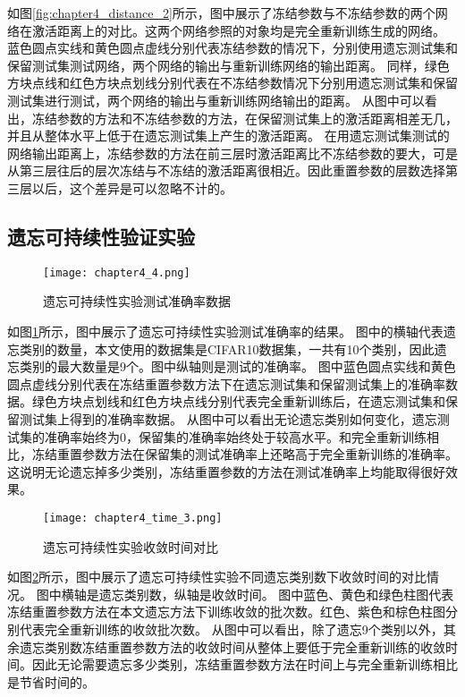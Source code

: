 如图\ref{fig:chapter4_distance_2}所示，图中展示了冻结参数与不冻结参数的两个网络在激活距离上的对比。这两个网络参照的对象均是完全重新训练生成的网络。
蓝色圆点实线和黄色圆点虚线分别代表冻结参数的情况下，分别使用遗忘测试集和保留测试集测试网络，两个网络的输出与重新训练网络的输出距离。
同样，绿色方块点线和红色方块点划线分别代表在不冻结参数情况下分别用遗忘测试集和保留测试集进行测试，两个网络的输出与重新训练网络输出的距离。
从图中可以看出，冻结参数的方法和不冻结参数的方法，在保留测试集上的激活距离相差无几，并且从整体水平上低于在遗忘测试集上产生的激活距离。
在用遗忘测试集测试的网络输出距离上，冻结参数的方法在前三层时激活距离比不冻结参数的要大，可是从第三层往后的层次冻结与不冻结的激活距离很相近。因此重置参数的层数选择第三层以后，这个差异是可以忽略不计的。


\subsection{遗忘可持续性验证实验}
\begin{figure}
    \centering
    \texttt{[image: chapter4\_4.png]}
    \caption{遗忘可持续性实验测试准确率数据}
    \label{fig:chapter4_4}
\end{figure}

如图\ref{fig:chapter4_4}所示，图中展示了遗忘可持续性实验测试准确率的结果。
图中的横轴代表遗忘类别的数量，本文使用的数据集是CIFAR10数据集，一共有10个类别，因此遗忘类别的最大数量是9个。图中纵轴则是测试的准确率。
图中蓝色圆点实线和黄色圆点虚线分别代表在冻结重置参数方法下在遗忘测试集和保留测试集上的准确率数据。绿色方块点划线和红色方块点线分别代表完全重新训练后，在遗忘测试集和保留测试集上得到的准确率数据。
从图中可以看出无论遗忘类别如何变化，遗忘测试集的准确率始终为0，保留集的准确率始终处于较高水平。和完全重新训练相比，冻结重置参数方法在保留集的测试准确率上还略高于完全重新训练的准确率。
这说明无论遗忘掉多少类别，冻结重置参数的方法在测试准确率上均能取得很好效果。

\begin{figure}
    \centering
    \texttt{[image: chapter4\_time\_3.png]}
    \caption{遗忘可持续性实验收敛时间对比}
    \label{fig:chapter4_time_3}
\end{figure}

如图\ref{fig:chapter4_time_3}所示，图中展示了遗忘可持续性实验不同遗忘类别数下收敛时间的对比情况。
图中横轴是遗忘类别数，纵轴是收敛时间。
图中蓝色、黄色和绿色柱图代表冻结重置参数方法在本文遗忘方法下训练收敛的批次数。红色、紫色和棕色柱图分别代表完全重新训练的收敛批次数。
从图中可以看出，除了遗忘9个类别以外，其余遗忘类别数冻结重置参数方法的收敛时间从整体上要低于完全重新训练的收敛时间。因此无论需要遗忘多少类别，冻结重置参数方法在时间上与完全重新训练相比是节省时间的。

